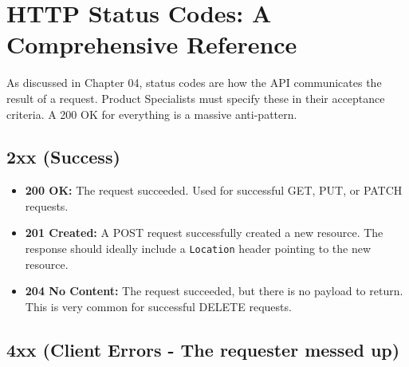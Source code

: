 \documentclass[
  11pt,
  openany,
  oneside]{book}
\providecommand{\tightlist}{%
  \setlength{\itemsep}{0pt}\setlength{\parskip}{0pt}}
\begin{document}
\section{HTTP Status Codes: A Comprehensive
Reference}\label{http-status-codes-a-comprehensive-reference}

As discussed in Chapter 04, status codes are how the API communicates
the result of a request. Product Specialists must specify these in their
acceptance criteria. A 200 OK for everything is a massive anti-pattern.

\subsection{2xx (Success)}\label{xx-success}

\begin{itemize}
\tightlist
\item
  \textbf{200 OK:} The request succeeded. Used for successful GET, PUT,
  or PATCH requests.
\item
  \textbf{201 Created:} A POST request successfully created a new
  resource. The response should ideally include a \texttt{Location}
  header pointing to the new resource.
\item
  \textbf{204 No Content:} The request succeeded, but there is no
  payload to return. This is very common for successful DELETE requests.
\end{itemize}

\subsection{4xx (Client Errors - The requester messed
up)}\label{xx-client-errors---the-requester-messed-up}
\end{document}
